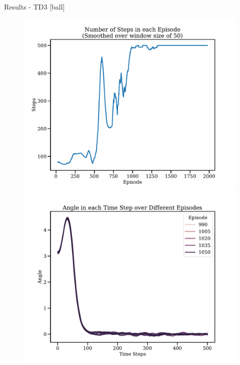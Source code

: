 \documentclass[10pt]{beamer}
\begin{document}
\begin{frame}[fragile]{Results - TD3}
[ball]
\begin{figure}[!htb]
  \includegraphics[width=\linewidth]{../results/td3_res_episode_steps.pdf}
\endminipage\hfill
{}
  \includegraphics[width=\linewidth]{../results/td3_res_Angle.pdf}
\endminipage\hfill
{}

\end{figure}
\end{frame}
\end{document}
